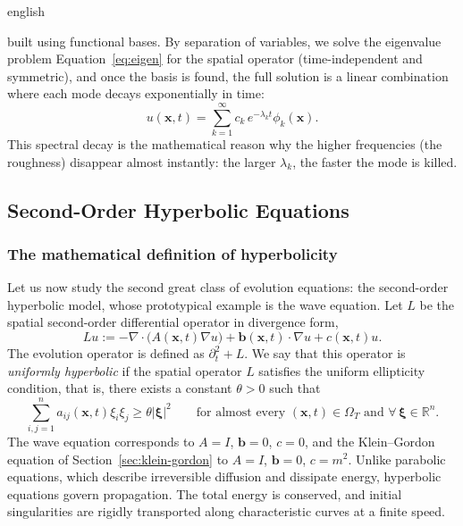 \documentclass[12pt,letterpaper,twoside]{book}
\newcommand{\abs}[1]{\left\lvert #1 \right\rvert}
\begin{document}
\begin{hyphenrules}{english}
\begin{enumerate}
    built using functional bases. By separation of variables, we solve the eigenvalue problem
    Equation~\eqref{eq:eigen} for the spatial operator (time-independent and symmetric), and once the basis is
    found, the full solution is a linear combination where each mode decays exponentially in time:
    \begin{equation}
      u(\mathbf{x},t)=\sum_{k=1}^{\infty}c_k\,e^{-\lambda_k t}\phi_k(\mathbf{x}).
      \label{eq:parabolic-modes}
    \end{equation}
    This spectral decay is the mathematical reason why the higher frequencies (the roughness)
    disappear almost instantly: the larger $\lambda_k$, the faster the mode is killed.
\end{enumerate}

\subsection{Second-Order Hyperbolic Equations}\label{subsec:hyperbolic}

\subsubsection{The mathematical definition of hyperbolicity}
Let us now study the second great class of evolution equations: the second-order hyperbolic model,
whose prototypical example is the wave equation. Let $L$ be the spatial second-order differential
operator in divergence form,
\begin{equation}
  Lu:=-\nabla\cdot\big(A(\mathbf{x},t)\nabla u\big)+\mathbf{b}(\mathbf{x},t)\cdot\nabla u+c(\mathbf{x},t)u.
  \label{eq:hyperbolic-op}
\end{equation}
The evolution operator is defined as $\partial_t^2+L$. We say that this operator is \emph{uniformly
hyperbolic} if the spatial operator $L$ satisfies the uniform ellipticity condition, that is, there
exists a constant $\theta>0$ such that
\begin{equation}
  \sum_{i,j=1}^{n}a_{ij}(\mathbf{x},t)\xi_i\xi_j\ge\theta\abs{\bm\xi}^2\qquad
  \text{for almost every }(\mathbf{x},t)\in\Omega_T\text{ and }\forall\,\bm\xi\in\mathbb{R}^n.
  \label{eq:uniform-hyperbolicity}
\end{equation}
The wave equation corresponds to $A=I$, $\mathbf{b}=0$, $c=0$, and the Klein--Gordon equation of
Section~\ref{sec:klein-gordon} to $A=I$, $\mathbf{b}=0$, $c=m^2$. Unlike parabolic equations, which describe
irreversible diffusion and dissipate energy, hyperbolic equations govern propagation. The total energy is
conserved, and initial singularities are rigidly transported along characteristic curves at a finite
speed.


\end{hyphenrules}
\end{document}
